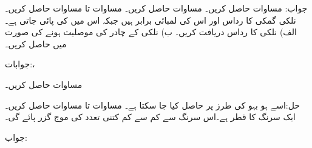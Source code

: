 جواب: 
مساوات  حاصل کریں۔
مساوات  حاصل کریں۔
مساوات  تا مساوات  حاصل کریں۔
نلکی گمکی کا رداس اور اس کی لمبائی برابر ہیں جبکہ اس میں  کی  پائی جاتی ہے۔ الف) نلکی کا رداس دریافت کریں۔ ب) نلکی کے چادر کی موصلیت  ہونے کی صورت میں  حاصل کریں۔ 

جوابات:، 

مساوات  حاصل کریں۔

حل:اسے ہو بہو  کی طرز پر حاصل کیا جا سکتا ہے۔ 
مساوات  تا مساوات  حاصل کریں۔
ایک سرنگ کا قطر  ہے۔اس سرنگ سے کم سے کم کتنی  تعدد کی موج گزر پائے گی۔

جواب:

